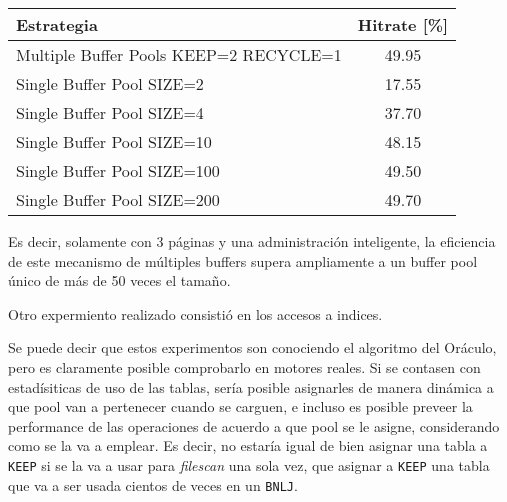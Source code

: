 \begin{table}[H]\centering
    \begin{tabular}{l || c}
    \large{\textbf{Estrategia}}                             & \large{\textbf{Hitrate}} [\%] \\
    \hline
    Multiple Buffer Pools KEEP=2 RECYCLE=1 & 49.95       \\
    Single Buffer Pool SIZE=2              & 17.55       \\
    Single Buffer Pool SIZE=4              & 37.70       \\
    Single Buffer Pool SIZE=10             & 48.15       \\
    Single Buffer Pool SIZE=100            & 49.50       \\
    Single Buffer Pool SIZE=200            & 49.70       \\
    \end{tabular}
\end{table}

Es decir, solamente con 3 p\'aginas y una administraci\'on inteligente, la eficiencia
de este mecanismo de m\'ultiples buffers supera ampliamente a un buffer pool \'unico de
m\'as de 50 veces el tama\~no.

Otro expermiento realizado consistió en los accesos a indices.

Se puede decir que estos experimentos son conociendo el algoritmo del Or\'aculo,
pero es claramente posible comprobarlo en motores reales. Si se contasen
con estadísiticas de uso de las tablas, sería posible asignarles de manera
din\'amica a que pool van a pertenecer cuando se carguen, e incluso es
posible preveer la performance de las operaciones de acuerdo a que pool
se le asigne, considerando como se la va a emplear. Es decir, no estaría
igual de bien asignar una tabla a \texttt{KEEP} si se la va a usar para \textit{filescan}
una sola vez, que asignar a \texttt{KEEP} una tabla que va a ser usada cientos de veces
en un \texttt{BNLJ}.
